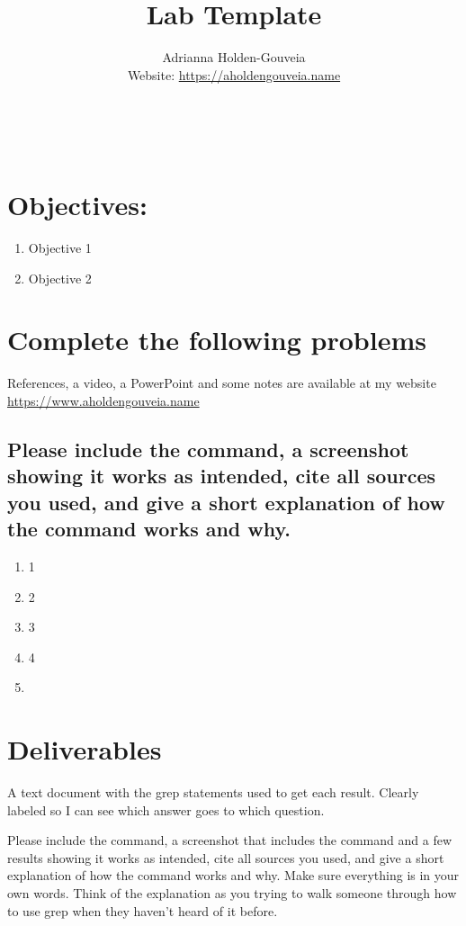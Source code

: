 \documentclass[12pt]{article}
\title{Lab Template}
\author{
        Adrianna Holden-Gouveia \\
        Website: \url{https://aholdengouveia.name}\\ 
        \date{\vspace{-5ex}}
        \faLinkedin{: aholdengouveia} \\
        \faGithub {: aholdengouveia} \\
        }
\begin{document}
    

\maketitle


\section*{Objectives:}
\begin{enumerate}
    \item Objective 1
    \item Objective 2
\end{enumerate}
\section*{Complete the following problems}

References, a video, a PowerPoint and some notes are available at my website
\url {https://www.aholdengouveia.name}

\subsection*{Please include the command, a screenshot showing it works as intended, cite all sources you used, and give a short explanation of how the command works and why.}
    \begin{enumerate}
        \item 1
        \item 2
        \item 3
        \item 4
        \item 


    \end{enumerate}



\section*{Deliverables}
A text document with the grep statements used to get each result.  Clearly labeled so I can see which answer goes to which question.


Please include the command, a screenshot that includes the command and a few results showing it works as intended, cite all sources you used, and give a short explanation of how the command works and why. Make sure everything is in your own words.  Think of the explanation as you trying to walk someone through how to use grep when they haven't heard of it before.
\end{document}
